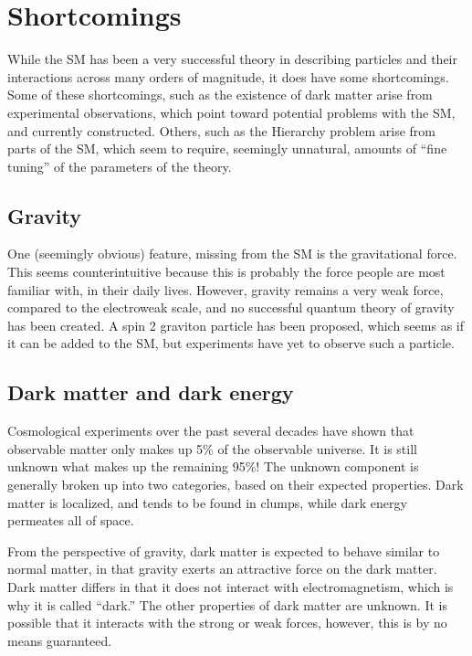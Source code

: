 \FloatBarrier
\section{Shortcomings}
\label{sec:sm_shortcomings}

While the SM has been a very successful theory in describing particles
and their interactions across many orders of magnitude, it does have some
shortcomings.
Some of these shortcomings, such as the existence of dark matter arise from
experimental observations, which point toward potential problems with the SM,
and currently constructed.
Others, such as the Hierarchy problem arise from parts of the SM, which seem
to require, seemingly unnatural, amounts of ``fine tuning'' of the parameters
of the theory.

\FloatBarrier
\subsection{Gravity}

One (seemingly obvious) feature, missing from the SM is the gravitational
force.
This seems counterintuitive because this is probably the force people are most
familiar with, in their daily lives.
However, gravity remains a very weak force, compared to the electroweak scale,
and no successful quantum theory of gravity has been created.
A spin 2 graviton particle has been proposed, which seems as if it can be added
to the SM, but experiments have yet to observe such a particle.

\FloatBarrier
\subsection{Dark matter and dark energy}

Cosmological experiments over the past several
decades\cite{Clowe:2006eq,Ade:2013zuv} have shown that observable matter
only makes up 5\% of the observable universe.
It is still unknown what makes up the remaining 95\%!
The unknown component is generally broken up into two categories, based on
their expected properties.
Dark matter is localized, and tends to be found in clumps, while dark energy
permeates all of space.

From the perspective of gravity, dark matter is expected to behave similar to
normal matter, in that gravity exerts an attractive force on the dark matter.
Dark matter differs in that it does not interact with electromagnetism,
which is why it is called ``dark.''
The other properties of dark matter are unknown.
It is possible that it interacts with the strong or weak forces, however, this
is by no means guaranteed.

